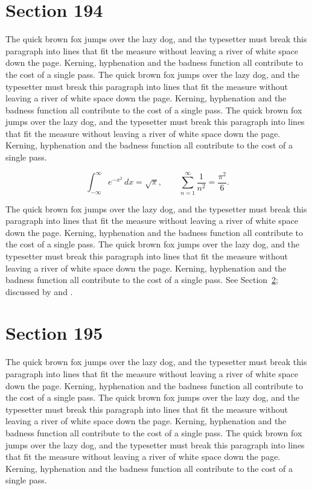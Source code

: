 \documentclass{article}
\begin{document}
\section{Section 194}
\label{sec:194}
The quick brown fox jumps over the lazy dog, and the typesetter must break this paragraph into lines that fit the measure without leaving a river of white space down the page. Kerning, hyphenation and the badness function all contribute to the cost of a single pass. The quick brown fox jumps over the lazy dog, and the typesetter must break this paragraph into lines that fit the measure without leaving a river of white space down the page. Kerning, hyphenation and the badness function all contribute to the cost of a single pass. The quick brown fox jumps over the lazy dog, and the typesetter must break this paragraph into lines that fit the measure without leaving a river of white space down the page. Kerning, hyphenation and the badness function all contribute to the cost of a single pass. 

\begin{equation}\label{eq:194}
\int_{-\infty}^{\infty} e^{-x^{2}}\,dx = \sqrt{\pi}, \qquad
\sum_{n=1}^{\infty} \frac{1}{n^{2}} = \frac{\pi^{2}}{6}.
\end{equation}

The quick brown fox jumps over the lazy dog, and the typesetter must break this paragraph into lines that fit the measure without leaving a river of white space down the page. Kerning, hyphenation and the badness function all contribute to the cost of a single pass. The quick brown fox jumps over the lazy dog, and the typesetter must break this paragraph into lines that fit the measure without leaving a river of white space down the page. Kerning, hyphenation and the badness function all contribute to the cost of a single pass. 
See Section~\ref{sec:195}; discussed by \textcite{k5} and \textcite{l2}.
\section{Section 195}
\label{sec:195}
The quick brown fox jumps over the lazy dog, and the typesetter must break this paragraph into lines that fit the measure without leaving a river of white space down the page. Kerning, hyphenation and the badness function all contribute to the cost of a single pass. The quick brown fox jumps over the lazy dog, and the typesetter must break this paragraph into lines that fit the measure without leaving a river of white space down the page. Kerning, hyphenation and the badness function all contribute to the cost of a single pass. The quick brown fox jumps over the lazy dog, and the typesetter must break this paragraph into lines that fit the measure without leaving a river of white space down the page. Kerning, hyphenation and the badness function all contribute to the cost of a single pass. 
\end{document}
